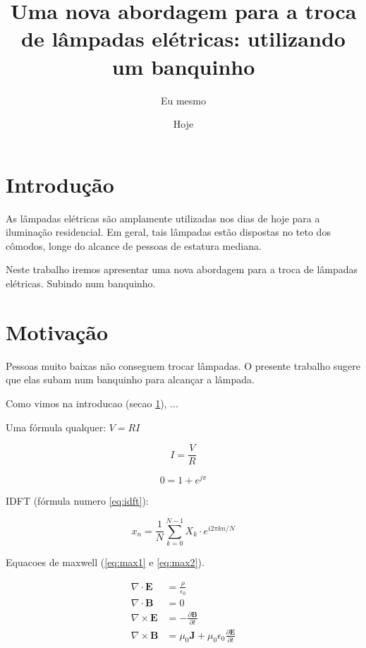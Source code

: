 \documentclass{article}
\author{Eu mesmo}
\date{Hoje}
\title{Uma nova abordagem para a troca de
       lâmpadas elétricas: utilizando um banquinho}
\newcommand{\vetor}[1]{\textbf{#1}}
\begin{document}
\maketitle

\newpage

\section{Introdução}
\label{sec:intro}

As lâmpadas elétricas são amplamente utilizadas nos dias
de hoje para a iluminação residencial.
Em geral, tais lâmpadas estão dispostas no teto dos cômodos,
longe do alcance de pessoas de estatura mediana.


Neste trabalho  iremos apresentar uma nova abordagem
para a troca  de lâmpadas elétricas.
Subindo  num  banquinho. %


\section{Motivação}
\label{sec:motiv}

Pessoas muito baixas não conseguem trocar lâmpadas.
O presente trabalho sugere que elas subam num
banquinho para alcançar a lâmpada.

\hfill

Como vimos na introducao (secao \ref{sec:intro}),
...

Uma fórmula qualquer: $V=R I$

$$I = \frac{V}{R}$$

$$0=1+e^{j\pi}$$

IDFT (fórmula numero \ref{eq:idft}):

\begin{equation}
\label{eq:idft}
x_n = \frac{1}{N}
\sum_{k=0}^{N-1} X_k \cdot
e^{i2\pi kn/N}
\end{equation}

Equacoes de maxwell (\ref{eq:max1} e \ref{eq:max2}).

\begin{align}
\label{eq:max1}
\nabla \cdot \vetor{E} & = \frac{\rho}{\epsilon_0} \\
\label{eq:max2}
\nabla \cdot \vetor{B} & = 0 \\
\nabla \times \vetor{E}
& = - \frac{\partial \vetor{B}}{\partial t} \\
\nabla \times \vetor{B} & =
\mu_0\vetor{J} + \mu_0 \epsilon_0
\frac{\partial \vetor{E}}{\partial t}
\end{align}
\end{document}
